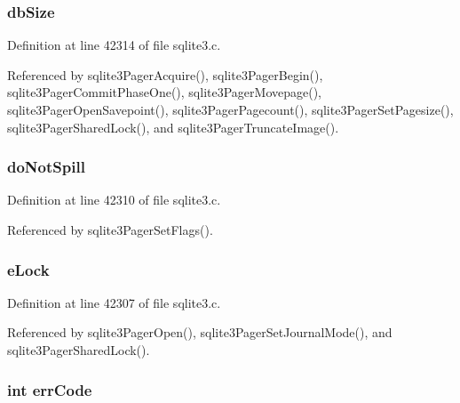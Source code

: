 \subsubsection[{db\+Size}]{ db\+Size}\label{struct_pager_afbe0739765fdd93414fe2457f0685a84}


Definition at line 42314 of file sqlite3.\+c.



Referenced by sqlite3\+Pager\+Acquire(), sqlite3\+Pager\+Begin(), sqlite3\+Pager\+Commit\+Phase\+One(), sqlite3\+Pager\+Movepage(), sqlite3\+Pager\+Open\+Savepoint(), sqlite3\+Pager\+Pagecount(), sqlite3\+Pager\+Set\+Pagesize(), sqlite3\+Pager\+Shared\+Lock(), and sqlite3\+Pager\+Truncate\+Image().

\hypertarget{struct_pager_a48ff798251fbec718249b6df3fd60b24}{}
\subsubsection[{do\+Not\+Spill}]{ do\+Not\+Spill}\label{struct_pager_a48ff798251fbec718249b6df3fd60b24}


Definition at line 42310 of file sqlite3.\+c.



Referenced by sqlite3\+Pager\+Set\+Flags().

\hypertarget{struct_pager_a94707eed51e15e9b3406656be1e3a39a}{}
\subsubsection[{e\+Lock}]{ e\+Lock}\label{struct_pager_a94707eed51e15e9b3406656be1e3a39a}


Definition at line 42307 of file sqlite3.\+c.



Referenced by sqlite3\+Pager\+Open(), sqlite3\+Pager\+Set\+Journal\+Mode(), and sqlite3\+Pager\+Shared\+Lock().

\hypertarget{struct_pager_af3fde244c3a673c0a8a0531b7a92c45a}{}
\subsubsection[{err\+Code}]{\setlength{\rightskip}{0pt plus 5cm}int err\+Code}\label{struct_pager_af3fde244c3a673c0a8a0531b7a92c45a}


